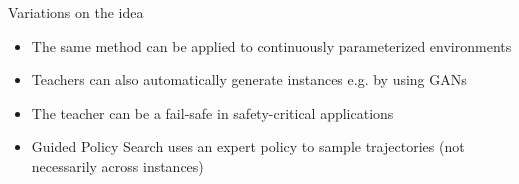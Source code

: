 \documentclass[aspectratio=169]{../latex_main/tntbeamer}  %
\begin{document}

\begin{frame}[c]{Variations on the idea}

	\begin{itemize}
		\item The same method can be applied to continuously parameterized environments 
		\item Teachers can also automatically generate instances e.g. by using GANs~
		\item The teacher can be a fail-safe in safety-critical applications 
		\item Guided Policy Search  uses an expert policy to sample trajectories (not necessarily across instances)
	\end{itemize}

\end{frame}

\end{document}
